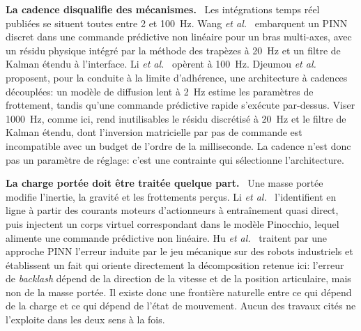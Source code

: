 \documentclass[a4paper, oneside]{article}
\newcommand{\parag}[1]{%
    \par\medskip\noindent\textbf{#1}\ \ignorespaces%
}
\begin{document}
\parag{La cadence disqualifie des mécanismes.} Les intégrations temps réel
publiées se situent toutes entre 2 et \SI{100}{Hz}. Wang \emph{et al.}~\cite{wang2024cac}
embarquent un PINN discret dans une commande prédictive non linéaire pour un
bras multi-axes, avec un résidu physique intégré par la méthode des trapèzes à
\SI{20}{Hz} et un filtre de Kalman étendu à l'interface. Li \emph{et al.}~\cite{li2025ral}
opèrent à \SI{100}{Hz}. Djeumou \emph{et al.}~\cite{djeumou2024drift} proposent, pour
la conduite à la limite d'adhérence, une architecture à cadences découplées: un
modèle de diffusion lent à \SI{2}{Hz} estime les paramètres de frottement, tandis
qu'une commande prédictive rapide s'exécute par-dessus. Viser \SI{1000}{Hz}, comme
ici, rend inutilisables le résidu discrétisé à \SI{20}{Hz} et le filtre de Kalman
étendu, dont l'inversion matricielle par pas de commande est incompatible avec
un budget de l'ordre de la milliseconde. La cadence n'est donc pas un paramètre
de réglage: c'est une contrainte qui sélectionne l'architecture.

\parag{La charge portée doit être traitée quelque part.} Une masse portée
modifie l'inertie, la gravité et les frottements perçus. Li \emph{et al.}~\cite{li2025ral}
l'identifient en ligne à partir des courants moteurs d'actionneurs à
entraînement quasi direct, puis injectent un corps virtuel correspondant dans
le modèle Pinocchio, lequel alimente une commande prédictive non linéaire.
Hu \emph{et al.}~\cite{hu2026} traitent par une approche PINN l'erreur induite
par le jeu mécanique sur des robots industriels et établissent un fait qui
oriente directement la décomposition retenue ici: l'erreur de \emph{backlash}
dépend de la direction de la vitesse et de la position articulaire, mais non de
la masse portée. Il existe donc une frontière naturelle entre ce qui dépend de
la charge et ce qui dépend de l'état de mouvement. Aucun des travaux cités ne
l'exploite dans les deux sens à la fois.
\end{document}
